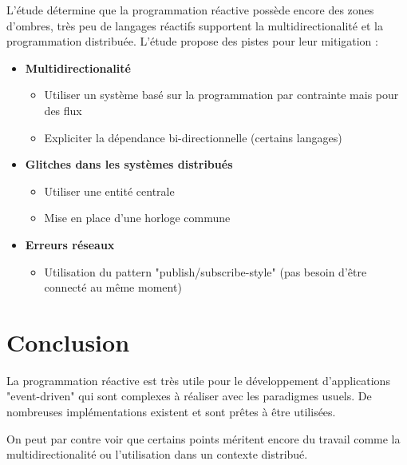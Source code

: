 \documentclass[10pt,final]{IEEEtran}
\begin{document}
L'étude détermine que la programmation réactive possède encore des zones d'ombres, très peu de langages réactifs
supportent la multidirectionalité et la programmation distribuée. L'étude propose des pistes pour leur mitigation :
\begin{itemize}
    \item \textbf{Multidirectionalité}
        \begin{itemize}
            \item Utiliser un système basé sur la programmation par contrainte mais pour des flux
            \item Expliciter la dépendance bi-directionnelle (certains langages)
        \end{itemize}
    \item \textbf{Glitches dans les systèmes distribués}
        \begin{itemize}
            \item Utiliser une entité centrale
            \item Mise en place d'une horloge commune
        \end{itemize}
    \item \textbf{Erreurs réseaux}
        \begin{itemize}
            \item Utilisation du pattern "publish/subscribe-style" (pas besoin d'être connecté au même moment)
        \end{itemize}
\end{itemize}

\section{Conclusion}

La programmation réactive est très utile pour le développement d'applications "event-driven" qui sont complexes à réaliser avec les paradigmes usuels. De nombreuses implémentations existent et sont prêtes à être utilisées.

On peut par contre voir que certains points méritent encore du travail comme la multidirectionalité ou l'utilisation dans un contexte distribué.
\end{document}
